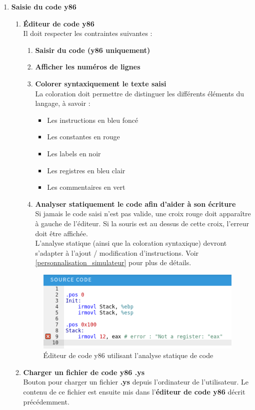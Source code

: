 \documentclass[french]{article}
\newcommand{\itembf}[1]{\item \textbf{#1}\\}
\begin{document}
\begin{enumerate}
    \itembf{Saisie du code y86}
    \begin{enumerate}
        \itembf{Éditeur de code y86} 
            Il doit respecter les contraintes suivantes :
        \begin{enumerate}
            \itembf{Saisir du code (y86 uniquement)}
            \itembf{Afficher les numéros de lignes}
            \itembf{Colorer syntaxiquement le texte saisi}
            La coloration doit permettre de distinguer les différents éléments du langage, à savoir :
            \begin{itemize}
                \item Les instructions en bleu foncé
                \item Les constantes en rouge
                \item Les labels en noir
                \item Les registres en bleu clair
                \item Les commentaires en vert
            \end{itemize}
            \itembf{Analyser statiquement le code afin d'aider à son écriture}
            Si jamais le code saisi n'est pas valide, une croix rouge doit apparaître à gauche de l'éditeur. Si la souris est au dessus de cette croix, l'erreur doit être affichée. \\
            L'analyse statique (ainsi que la coloration syntaxique) devront s'adapter à l'ajout / modification d'instructions. Voir \ref{personnalisation_simulateur} pour plus de détails.
        \end{enumerate}{}
        \begin{figure}[H]
            \centering
            \includegraphics{img/ex_ys_erreur.png}
            \caption{Éditeur de code y86 utilisant l'analyse statique de code}
            \label{fig:ex_ys_erreur}
        \end{figure}
        
        \itembf{Charger un fichier de code y86 \textbf{.ys}}
        Bouton pour charger un fichier \textbf{.ys} depuis l'ordinateur de l'utilisateur. Le contenu de ce fichier est ensuite mis dans l'\textbf{éditeur de code y86} décrit précédemment.
    \end{enumerate}{}
    

\end{enumerate}
\end{document}

